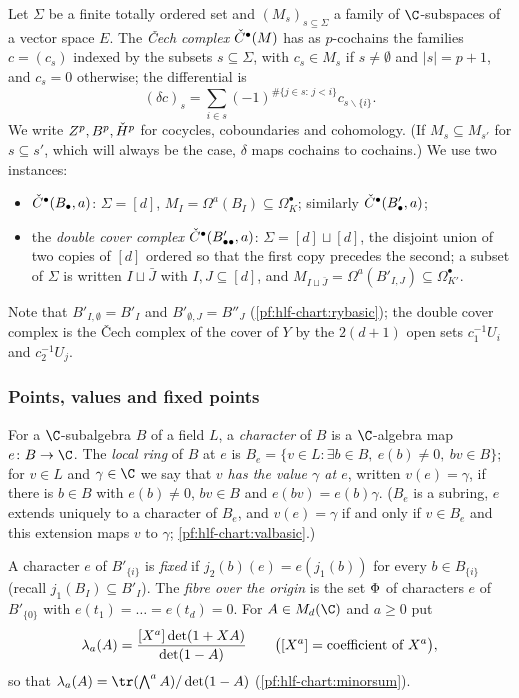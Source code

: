 Let $\Sigma$ be a finite totally ordered set and $(M_s)_{s\subseteq\Sigma}$ a family of $\C$-subspaces of a vector space $E$. The
\emph{\v{C}ech complex} $\check{C}^\bullet(M)$ has as $p$-cochains the families $c=(c_s)$ indexed by the subsets $s\subseteq\Sigma$, with
$c_s\in M_s$ if $s\ne\emptyset$ and $|s|=p+1$, and $c_s=0$ otherwise; the differential is
\begin{equation}\label{eq:pf:hlf-chart:cech}
  (\delta c)_s=\sum_{i\in s}(-1)^{\#\{j\in s:\,j<i\}}c_{s\smallsetminus\{i\}}.
\end{equation}
We write $Z^p,B^p,\check{H}^p$ for cocycles, coboundaries and cohomology. (If $M_s\subseteq M_{s'}$ for $s\subseteq s'$, which will always be the
case, $\delta$ maps cochains to cochains.) We use two instances:
\begin{itemize}[nosep]
\item $\check{C}^\bullet(B_\bullet,a)$: $\Sigma=[d]$, $M_I=\Omega^a(B_I)\subseteq\Omega^\bullet_K$; similarly $\check{C}^\bullet(B'_\bullet,a)$;
\item the \emph{double cover complex} $\check{C}^\bullet(B'_{\bullet\bullet},a)$: $\Sigma=[d]\sqcup[d]$, the disjoint union of two copies of $[d]$
ordered so that the first copy precedes the second; a subset of $\Sigma$ is written $I\sqcup\bar J$ with $I,J\subseteq[d]$, and
$M_{I\sqcup\bar J}=\Omega^a(B'_{I,J})\subseteq\Omega^\bullet_{K'}$.
\end{itemize}
Note that $B'_{I,\emptyset}=B'_I$ and $B'_{\emptyset,J}=B''_J$ (\cref{pf:hlf-chart:rybasic}); the double cover complex is the \v{C}ech
complex of the cover of $Y$ by the $2(d+1)$ open sets $c_1^{-1}U_i$ and $c_2^{-1}U_j$.

\subsubsection*{Points, values and fixed points}
For a $\C$-subalgebra $B$ of a field $L$, a \emph{character} of $B$ is a $\C$-algebra map $e\colon B\to\C$. The \emph{local ring} of $B$ at $e$
is $B_e=\{v\in L:\exists b\in B,\ e(b)\ne0,\ bv\in B\}$; for $v\in L$ and $\gamma\in\C$ we say that \emph{$v$ has the value $\gamma$ at $e$},
written $v(e)=\gamma$, if there is $b\in B$ with $e(b)\ne0$, $bv\in B$ and $e(bv)=e(b)\gamma$. ($B_e$ is a subring, $e$ extends uniquely to a
character of $B_e$, and $v(e)=\gamma$ if and only if $v\in B_e$ and this extension maps $v$ to $\gamma$; \cref{pf:hlf-chart:valbasic}.)

A character $e$ of $B'_{\{i\}}$ is \emph{fixed} if $j_2(b)(e)=e(j_1(b))$ for every $b\in B_{\{i\}}$ (recall $j_1(B_I)\subseteq B'_I$). The
\emph{fibre over the origin} is the set $\Phi$ of characters $e$ of $B'_{\{0\}}$ with $e(t_1)=\dots=e(t_d)=0$. For
$A\in M_d(\C)$ and $a\ge0$ put
\begin{equation}\label{eq:pf:hlf-chart:locterm}
  \lambda_a(A)=\frac{[X^a]\det(1+XA)}{\det(1-A)}\qquad\bigl([X^a]=\text{coefficient of }X^a\bigr),
\end{equation}
so that $\hlfcloc_a(A)=\tr(\bigwedge^aA)/\det(1-A)$ (\cref{pf:hlf-chart:minorsum}).

